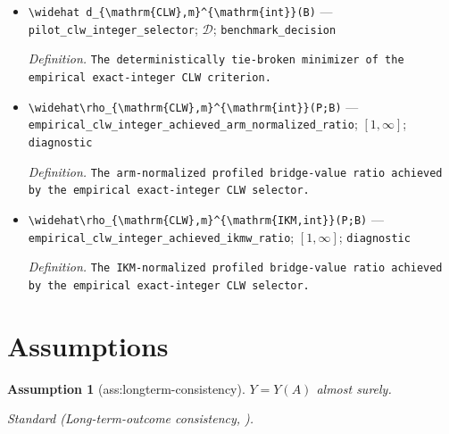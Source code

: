\documentclass{article}
\newtheorem{assumption}{Assumption}
\begin{document}
\begin{itemize}
  \item \texttt{\textbackslash{}\allowbreak{}widehat d\_\allowbreak{}\{\textbackslash{}\allowbreak{}mathrm\{CLW\}\allowbreak{},\allowbreak{}m\}\allowbreak{}\textasciicircum{}\{\textbackslash{}\allowbreak{}mathrm\{int\}\allowbreak{}\}\allowbreak{}(B)} --- \texttt{pilot\_\allowbreak{}clw\_\allowbreak{}integer\_\allowbreak{}selector}; \(\mathcal D\); \texttt{benchmark\_\allowbreak{}decision}
  \par\smallskip\noindent\emph{Definition.} \texttt{The deterministically tie-\allowbreak{}broken minimizer of the empirical exact-\allowbreak{}integer CLW criterion.}
  \item \texttt{\textbackslash{}\allowbreak{}widehat\textbackslash{}\allowbreak{}rho\_\allowbreak{}\{\textbackslash{}\allowbreak{}mathrm\{CLW\}\allowbreak{},\allowbreak{}m\}\allowbreak{}\textasciicircum{}\{\textbackslash{}\allowbreak{}mathrm\{int\}\allowbreak{}\}\allowbreak{}(P;\allowbreak{}B)} --- \texttt{empirical\_\allowbreak{}clw\_\allowbreak{}integer\_\allowbreak{}achieved\_\allowbreak{}arm\_\allowbreak{}normalized\_\allowbreak{}ratio}; \([1,\infty]\); \texttt{diagnostic}
  \par\smallskip\noindent\emph{Definition.} \texttt{The arm-\allowbreak{}normalized profiled bridge-\allowbreak{}value ratio achieved by the empirical exact-\allowbreak{}integer CLW selector.}
  \item \texttt{\textbackslash{}\allowbreak{}widehat\textbackslash{}\allowbreak{}rho\_\allowbreak{}\{\textbackslash{}\allowbreak{}mathrm\{CLW\}\allowbreak{},\allowbreak{}m\}\allowbreak{}\textasciicircum{}\{\textbackslash{}\allowbreak{}mathrm\{IKM,\allowbreak{}int\}\allowbreak{}\}\allowbreak{}(P;\allowbreak{}B)} --- \texttt{empirical\_\allowbreak{}clw\_\allowbreak{}integer\_\allowbreak{}achieved\_\allowbreak{}ikmw\_\allowbreak{}ratio}; \([1,\infty]\); \texttt{diagnostic}
  \par\smallskip\noindent\emph{Definition.} \texttt{The IKM-\allowbreak{}normalized profiled bridge-\allowbreak{}value ratio achieved by the empirical exact-\allowbreak{}integer CLW selector.}
\end{itemize}

\section{Assumptions}

\begin{assumption}[ass:longterm-consistency]\label{ass:longterm-consistency}
\(Y=Y(A)\) almost surely.
\par\smallskip\noindent\emph{Standard} (Long-term-outcome consistency, \cite{ImbensKallusMaoWang2025}).
\end{assumption}
\end{document}
